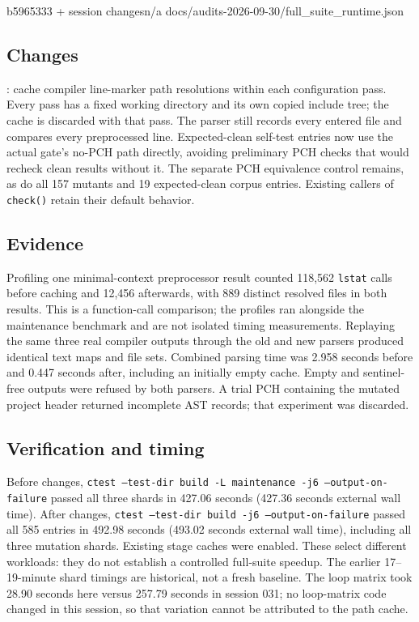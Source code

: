 %
  {b5965333 + session changes}{n/a}%
  {docs/audits-2026-09-30/full\_suite\_runtime.json}

\subsection*{Changes}
: cache compiler line-marker path resolutions
within each configuration pass. Every pass has a fixed working directory and
its own copied include tree; the cache is discarded with that pass. The parser
still records every entered file and compares every preprocessed line.
Expected-clean self-test entries now use the actual gate's no-PCH path directly,
avoiding preliminary PCH checks that would recheck clean results without it.
The separate PCH equivalence control remains, as do all 157 mutants and
19 expected-clean corpus entries. Existing callers of \texttt{check()} retain
their default behavior.

\subsection*{Evidence}
Profiling one minimal-context preprocessor result counted 118,562
\texttt{lstat} calls before caching and 12,456 afterwards, with 889 distinct
resolved files in both results. This is a function-call comparison; the
profiles ran alongside the maintenance benchmark and are not isolated timing
measurements. Replaying the same three real compiler outputs through the old
and new parsers produced identical text maps and file sets. Combined parsing
time was 2.958 seconds before and 0.447 seconds after, including an initially
empty cache. Empty and sentinel-free outputs were refused by both parsers.
A trial PCH containing the mutated project header returned incomplete AST
records; that experiment was discarded.

\subsection*{Verification and timing}
Before changes, \texttt{ctest --test-dir build -L maintenance -j6 --output-on-failure}
passed all three shards in 427.06 seconds (427.36 seconds external wall time).
After changes, \texttt{ctest --test-dir build -j6 --output-on-failure}
passed all 585 entries in 492.98 seconds (493.02 seconds external wall time),
including all three mutation shards. Existing stage caches were enabled.
These select different workloads: they do not establish a controlled full-suite
speedup. The earlier 17--19-minute shard timings are historical, not a fresh
baseline. The loop matrix took 28.90 seconds here versus 257.79 seconds in
session 031; no loop-matrix code changed in this session, so that variation
cannot be attributed to the path cache.


